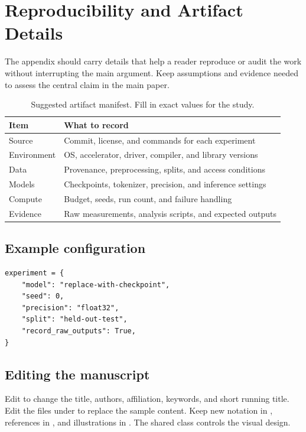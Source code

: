 \section{Reproducibility and Artifact Details}
\label{app:reproducibility}
The appendix should carry details that help a reader reproduce or audit the
work without interrupting the main argument. Keep assumptions and evidence
needed to assess the central claim in the main paper.

\begin{table}[h]
  \caption{Suggested artifact manifest. Fill in exact values for the study.}
  \centering\small
  \begin{tabularx}{\linewidth}{@{}lX@{}}
    \toprule
    \textbf{Item} & \textbf{What to record} \\
    \midrule
    Source & Commit, license, and commands for each experiment \\
    Environment & OS, accelerator, driver, compiler, and library versions \\
    Data & Provenance, preprocessing, splits, and access conditions \\
    Models & Checkpoints, tokenizer, precision, and inference settings \\
    Compute & Budget, seeds, run count, and failure handling \\
    Evidence & Raw measurements, analysis scripts, and expected outputs \\
    \bottomrule
  \end{tabularx}
\end{table}

\subsection{Example configuration}
\begin{lstlisting}[language=REINPython,caption={An illustrative configuration
schema. Values must be chosen for the actual experiment.},label={lst:config}]
experiment = {
    "model": "replace-with-checkpoint",
    "seed": 0,
    "precision": "float32",
    "split": "held-out-test",
    "record_raw_outputs": True,
}
\end{lstlisting}

\subsection{Editing the manuscript}
Edit  to change the title, authors, affiliation,
keywords, and short running title. Edit the files under
 to replace the sample content. Keep new notation in
, references in , and illustrations in
. The shared class controls the visual design.

